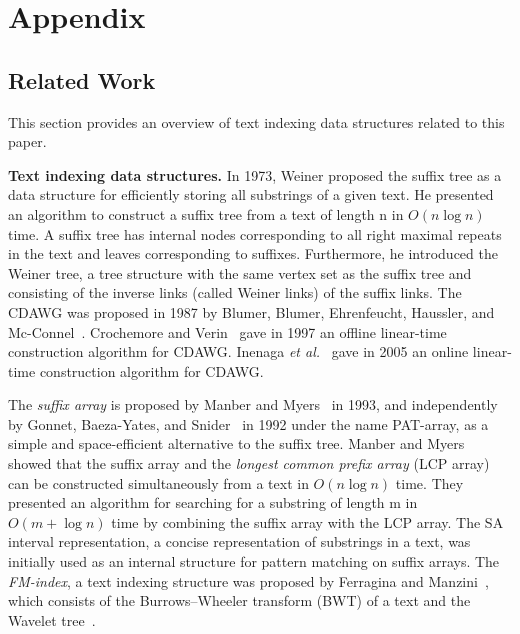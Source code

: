 \section{Appendix}

\subsection{Related Work}

This section provides an overview of text indexing data structures related to this paper. 

\textbf{Text indexing data structures.} In 1973, Weiner \cite{weiner1973linear} proposed the suffix tree as a data structure for efficiently storing all substrings of a given text. He presented an algorithm to construct a suffix tree from a text of length n in $O(n \log n)$ time. A suffix tree has internal nodes corresponding to all right maximal repeats in the text and leaves corresponding to suffixes. Furthermore, he introduced the Weiner tree, a tree structure with the same vertex set as the suffix tree and consisting of the inverse links (called Weiner links) of the suffix links.
The CDAWG was proposed in 1987 by Blumer, Blumer, Ehrenfeucht, Haussler, and Mc-Connel~\cite{blumer1987complete}. Crochemore and Verin~\cite{crochemore:verin1997compact} gave in 1997 an offline linear-time construction algorithm for CDAWG. Inenaga \textit{et al.}~\cite{inenaga2005online} gave in 2005 an online linear-time construction algorithm for CDAWG.

The \textit{suffix array} is proposed by Manber and Myers~\cite{ManberM93:SA} in 1993, and independently by Gonnet, Baeza-Yates, and Snider~\cite{gonnet1992patarray} in 1992 under the name PAT-array, as a simple and space-efficient alternative to the suffix tree. Manber and Myers~\cite{ManberM93:SA} showed that the suffix array and the \textit{longest common prefix array} (LCP array) can be constructed simultaneously from a text in $O(n \log n)$ time. They presented an algorithm for searching for a substring of length m in $O(m+ \log n)$ time by combining the suffix array with the LCP array. The SA interval representation, a concise representation of substrings in a text, was initially used as an internal structure for pattern matching on suffix arrays.
The \textit{FM-index}, a text indexing structure was proposed by Ferragina and Manzini~\cite{Ferragina05:FM}, which consists of the Burrows–Wheeler transform (BWT) of a text and the Wavelet tree~\cite{grossi2003high}. 

